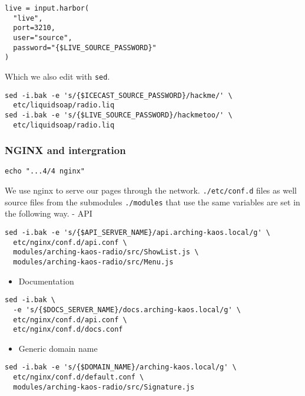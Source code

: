 \documentclass[12pt]{report}
\begin{document}
\begin{verbatim}
live = input.harbor(
  "live",
  port=3210,
  user="source",
  password="{$LIVE_SOURCE_PASSWORD}"
) 
\end{verbatim}

Which we also edit with \texttt{sed}.

\begin{verbatim}
sed -i.bak -e 's/{$ICECAST_SOURCE_PASSWORD}/hackme/' \
  etc/liquidsoap/radio.liq
sed -i.bak -e 's/{$LIVE_SOURCE_PASSWORD}/hackmetoo/' \
  etc/liquidsoap/radio.liq
\end{verbatim}


\subsubsection{NGINX and intergration}\label{nginx-and-intergration}

\begin{verbatim}
echo "...4/4 nginx"
\end{verbatim}

We use nginx to serve our pages through the network.
\texttt{./etc/conf.d} files as well source files from the submodules
\texttt{./modules} that use the same variables are set in the following
way. - API

\begin{verbatim}
sed -i.bak -e 's/{$API_SERVER_NAME}/api.arching-kaos.local/g' \
  etc/nginx/conf.d/api.conf \
  modules/arching-kaos-radio/src/ShowList.js \
  modules/arching-kaos-radio/src/Menu.js
\end{verbatim}

\begin{itemize}

\item
  Documentation
\end{itemize}

\begin{verbatim}
sed -i.bak \
  -e 's/{$DOCS_SERVER_NAME}/docs.arching-kaos.local/g' \
  etc/nginx/conf.d/api.conf \
  etc/nginx/conf.d/docs.conf
\end{verbatim}

\begin{itemize}

\item
  Generic domain name
\end{itemize}

\begin{verbatim}
sed -i.bak -e 's/{$DOMAIN_NAME}/arching-kaos.local/g' \
  etc/nginx/conf.d/default.conf \
  modules/arching-kaos-radio/src/Signature.js
\end{verbatim}
\end{document}
